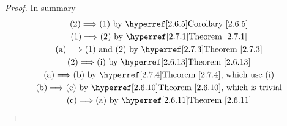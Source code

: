 \documentclass{report}
\begin{document}
\begin{proof}
In summary 
\begin{gather}
\text{(2)$\implies $(1) by \myref{Corollary}{2.6.5}}\\
\text{(1)$\implies $(2) by \myref{Theorem}{2.7.1}}\\
\text{(a)$\implies $(1) and (2) by \myref{Theorem}{2.7.3}}\\
\text{(2)$\implies $(i) by \myref{Theorem}{2.6.13}}\\
\text{(a)$\implies $(b) by \myref{Theorem}{2.7.4}, which use  (i)}\\
\text{(b)$\implies$(c) by \myref{Theorem}{2.6.10}, which is trivial}\\
\text{(c)$\implies $(a) by \myref{Theorem}{2.6.11}}
\end{gather}
\end{proof}
\end{document}

